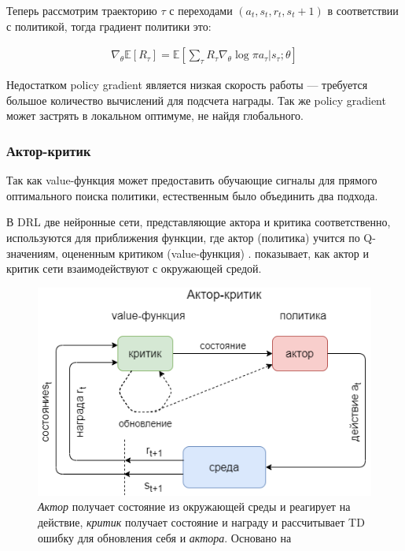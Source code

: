 Теперь рассмотрим траекторию $\tau$ с переходами $(a_t, s_t, r_t, s_t+1)$ в соответствии с политикой, тогда градиент политики это:

\begin{equation}
\label{eq:ch1-likelihood-ratios}
\begin{multlined}
\nabla_\theta \mathbb{E}[R_\tau] = \mathbb{E}[\sum_\tau R_\tau \nabla_\theta \log \pi {a_\tau|s_\tau;\theta}]
\end{multlined}
\end{equation}

Недостатком policy gradient является низкая скорость работы — требуется большое количество вычислений для подсчета награды. Так же policy gradient может застрять в локальном оптимуме, не найдя глобального.

\subsubsection{Актор-критик}

Так как value-функция может предоставить обучающие сигналы для прямого оптимального поиска политики, естественным было объединить два подхода.

В DRL две нейронные сети, представляющие актора и критика соответственно, используются для приближения функции, где актор (политика) учится по Q-значениям, оцененным критиком (value-функция) \cite{Arulkumaran_2017}.  показывает, как актор и критик сети взаимодействуют с окружающей средой.

\begin{figure}[ht!]
	\center
	\includegraphics [scale=0.60] {my_folder/images/ch1/RL-actor-critic.png}
	\caption{{\itshape Актор} получает состояние из окружающей среды и реагирует на действие, {\itshape критик} получает состояние и награду и рассчитывает TD ошибку для обновления себя и {\itshape актора}. Основано на \cite{Arulkumaran_2017}}
	\label{fig:ch1-RL-actor-critic}
\end{figure} %

